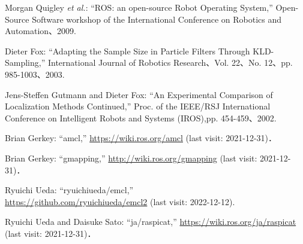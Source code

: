 \documentclass[twocolumn,9pt]{jsproceedings}
\begin{document}
\footnotesize
\begin{thebibliography}{99}
	  Morgan Quigley {\it et al.}: ``ROS: an open-source Robot Operating System,'' 
Open-Source Software workshop of the International Conference on Robotics and Automation、2009. 

Dieter Fox:
``Adapting the Sample Size in Particle Filters Through KLD-Sampling,''
International Journal of Robotics Research、Vol. 22、No. 12、pp. 985-1003、2003. 

Jens-Steffen Gutmann and Dieter Fox: 
``An Experimental Comparison of Localization Methods Continued,''
Proc. of the IEEE/RSJ International Conference on Intelligent Robots and Systems (IROS),pp. 454-459、2002.
  

  
  
  
  Brian Gerkey: ``amcl,'' \url{https://wiki.ros.org/amcl} (last visit: 2021-12-31)．

  Brian Gerkey: ``gmapping,'' \url{http://wiki.ros.org/gmapping} (last visit: 2021-12-31)．
  
  
Ryuichi Ueda: ``ryuichiueda/emcl,''\\\url{https://github.com/ryuichiueda/emcl2} (last visit: 2022-12-12).

  Ryuichi Ueda and Daisuke Sato: ``ja/raspicat,'' \url{https://wiki.ros.org/ja/raspicat} (last visit: 2021-12-31)．
  


\end{thebibliography}
\end{document}
